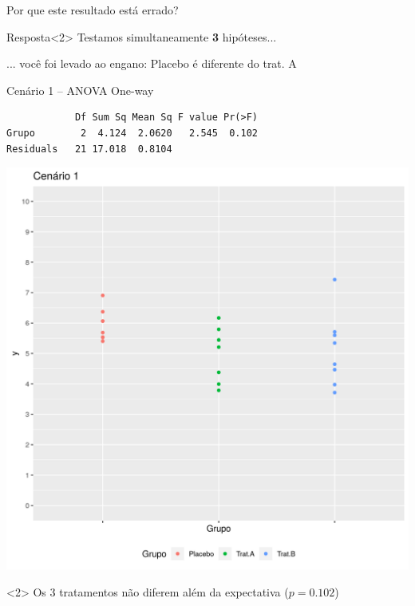 \documentclass{beamer}
\begin{document}
\begin{frame}{\scriptsize }
  \begin{center}
    Por que este resultado está errado?
  \end{center}

  \vfill
  \begin{block}{Resposta}<2>
    Testamos simultaneamente {\bf 3} hipóteses...

    \bigskip
    \small
    ... você foi levado ao engano: Placebo é diferente do trat. A
  \end{block}
\end{frame}

\begin{frame}[fragile, label=cenario1-1way]{\scriptsize }
  \begin{exampleblock}{Cenário 1 -- ANOVA One-way}
    \tiny
\begin{verbatim}
            Df Sum Sq Mean Sq F value Pr(>F)
Grupo        2  4.124  2.0620   2.545  0.102
Residuals   21 17.018  0.8104
\end{verbatim}
    \begin{center}
      \includegraphics[height=.5\textheight]{Cap13-30/cenario11}
    \end{center}
  \end{exampleblock}
  \begin{block}{}<2>
    \small
    Os 3 tratamentos não diferem além da expectativa ($p=0.102$)
  \end{block}
\end{frame}
\end{document}
